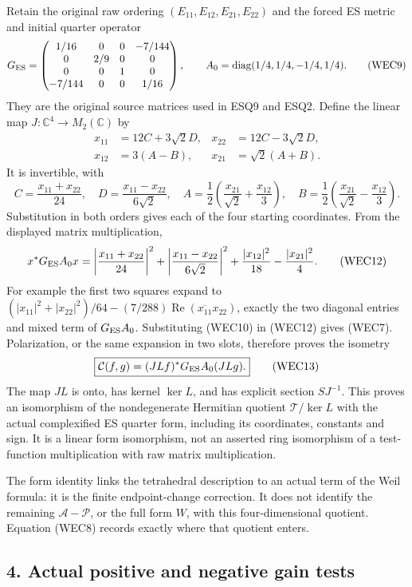 \documentclass[
  10pt,
  a4paper,
]{article}
\begin{document}
Retain the original raw ordering \((E_{11},E_{12},E_{21},E_{22})\) and
the forced ES metric and initial quarter operator \[
G_{\rm ES}=\begin{pmatrix}
1/16&0&0&-7/144\\0&2/9&0&0\\0&0&1&0\\-7/144&0&0&1/16
\end{pmatrix},\qquad
A_0=\operatorname{diag}(1/4,1/4,-1/4,1/4).
\tag{WEC9}
\] They are the original source matrices used in ESQ9 and ESQ2. Define
the linear map \(J:\mathbb C^4\to M_2(\mathbb C)\) by \[
\begin{aligned}
x_{11}&=12C+3\sqrt2D,&x_{22}&=12C-3\sqrt2D,\\
x_{12}&=3(A-B),&x_{21}&=\sqrt2(A+B).
\end{aligned}
\tag{WEC10}
\] It is invertible, with \[
C=\frac{x_{11}+x_{22}}{24},\quad D=\frac{x_{11}-x_{22}}{6\sqrt2},\quad
A=\frac12\left(\frac{x_{21}}{\sqrt2}+\frac{x_{12}}3\right),\quad
B=\frac12\left(\frac{x_{21}}{\sqrt2}-\frac{x_{12}}3\right).
\tag{WEC11}
\] Substitution in both orders gives each of the four starting
coordinates. From the displayed matrix multiplication, \[
x^*G_{\rm ES}A_0x=
\left|\frac{x_{11}+x_{22}}{24}\right|^2+
\left|\frac{x_{11}-x_{22}}{6\sqrt2}\right|^2+
\frac{|x_{12}|^2}{18}-\frac{|x_{21}|^2}{4}.
\tag{WEC12}
\] For example the first two squares expand to
\((|x_{11}|^2+|x_{22}|^2)/64-(7/288)\operatorname{Re}(\overline{x_{11}}x_{22})\),
exactly the two diagonal entries and mixed term of \(G_{\rm ES}A_0\).
Substituting (WEC10) in (WEC12) gives (WEC7). Polarization, or the same
expansion in two slots, therefore proves the isometry \[
\boxed{\mathcal C(f,g)=(JLf)^*G_{\rm ES}A_0(JLg).}
\tag{WEC13}
\] The map \(JL\) is onto, has kernel \(\ker L\), and has explicit
section \(SJ^{-1}\). This proves an isomorphism of the nondegenerate
Hermitian quotient \(\mathcal T/\ker L\) with the actual complexified ES
quarter form, including its coordinates, constants and sign. It is a
linear form isomorphism, not an asserted ring isomorphism of a
test-function multiplication with raw matrix multiplication.

The form identity links the tetrahedral description to an actual term of
the Weil formula: it is the finite endpoint-change correction. It does
not identify the remaining \(\mathcal A-\mathcal P\), or the full form
\(W\), with this four-dimensional quotient. Equation (WEC8) records
exactly where that quotient enters.

\subsection{4. Actual positive and negative gain
tests}\label{actual-positive-and-negative-gain-tests}
\end{document}
